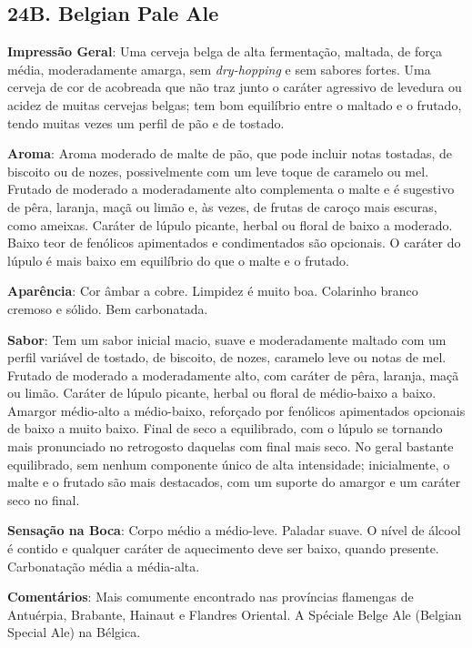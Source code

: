 \subsection*{24B. Belgian Pale Ale}
\textbf{Impressão Geral}: Uma cerveja belga de alta fermentação, maltada, de força média, moderadamente amarga, sem \textit{dry-hopping} e sem sabores fortes. Uma cerveja de cor de acobreada que não traz junto o caráter agressivo de levedura ou acidez de muitas cervejas belgas; tem bom equilíbrio entre o maltado e o frutado, tendo muitas vezes um perfil de pão e de tostado.

\textbf{Aroma}: Aroma moderado de malte de pão, que pode incluir notas tostadas, de biscoito ou de nozes, possivelmente com um leve toque de caramelo ou mel. Frutado de moderado a moderadamente alto complementa o malte e é sugestivo de pêra, laranja, maçã ou limão e, às vezes, de frutas de caroço mais escuras, como ameixas. Caráter de lúpulo picante, herbal ou floral de baixo a moderado. Baixo teor de fenólicos apimentados e condimentados são opcionais. O caráter do lúpulo é mais baixo em equilíbrio do que o malte e o frutado.

\textbf{Aparência}: Cor âmbar a cobre. Limpidez é muito boa. Colarinho branco cremoso e sólido. Bem carbonatada.

\textbf{Sabor}: Tem um sabor inicial macio, suave e moderadamente maltado com um perfil variável de tostado, de biscoito, de nozes, caramelo leve ou notas de mel. Frutado de moderado a moderadamente alto, com caráter de pêra, laranja, maçã ou limão. Caráter de lúpulo picante, herbal ou floral de médio-baixo a baixo. Amargor médio-alto a médio-baixo, reforçado por fenólicos apimentados opcionais de baixo a muito baixo. Final de seco a equilibrado, com o lúpulo se tornando mais pronunciado no retrogosto daquelas com final mais seco. No geral bastante equilibrado, sem nenhum componente único de alta intensidade; inicialmente, o malte e o frutado são mais destacados, com um suporte do amargor e um caráter seco no final.

\textbf{Sensação na Boca}: Corpo médio a médio-leve. Paladar suave. O nível de álcool é contido e qualquer caráter de aquecimento deve ser baixo, quando presente. Carbonatação média a média-alta.

\textbf{Comentários}: Mais comumente encontrado nas províncias flamengas de Antuérpia, Brabante, Hainaut e Flandres Oriental. A Spéciale Belge Ale (Belgian Special Ale) na Bélgica.

